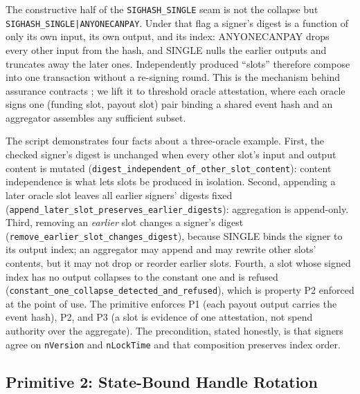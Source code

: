 \documentclass[11pt]{article}
\begin{document}
The constructive half of the \texttt{SIGHASH\_SINGLE} seam is not the collapse
but \texttt{SIGHASH\_SINGLE|ANYONECANPAY}. Under that flag a signer's digest is
a function of only its own input, its own output, and its index: ANYONECANPAY
drops every other input from the hash, and SINGLE nulls the earlier outputs and
truncates away the later ones. Independently produced ``slots'' therefore
compose into one transaction without a re-signing round. This is the mechanism
behind assurance contracts \cite{bitcoinwiki_contracts}; we lift it to
threshold oracle attestation, where each oracle signs one
(funding slot, payout slot) pair binding a shared event hash and an aggregator
assembles any sufficient subset.

The script demonstrates four facts about a three-oracle example. First, the
checked signer's digest is unchanged when every other slot's input and output
content is mutated (\texttt{digest\_independent\_of\_other\_slot\_content}):
content independence is what lets slots be produced in isolation. Second,
appending a later oracle slot leaves all earlier signers' digests fixed
(\texttt{append\_later\_slot\_preserves\_earlier\_digests}): aggregation is
append-only. Third, removing an \emph{earlier} slot changes a signer's digest
(\texttt{remove\_earlier\_slot\_changes\_digest}), because SINGLE binds the
signer to its output index; an aggregator may append and may rewrite other
slots' contents, but it may not drop or reorder earlier slots. Fourth, a slot
whose signed index has no output collapses to the constant one and is refused
(\texttt{constant\_one\_collapse\_detected\_and\_refused}), which is property P2
enforced at the point of use. The primitive enforces P1 (each payout output
carries the event hash), P2, and P3 (a slot is evidence of one attestation, not
spend authority over the aggregate). The precondition, stated honestly, is that
signers agree on \texttt{nVersion} and \texttt{nLockTime} and that composition
preserves index order.

\subsection{Primitive 2: State-Bound Handle Rotation}
\end{document}
